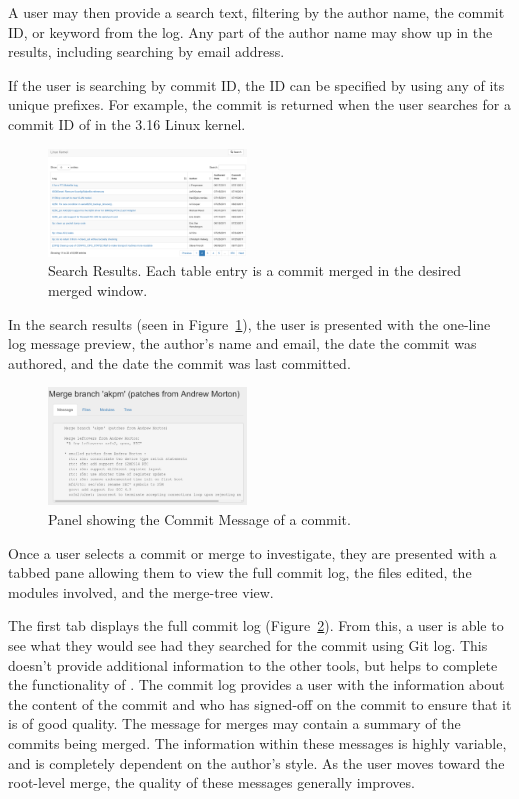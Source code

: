 A user may then provide a search text, filtering by the author name, the
commit ID, or keyword from the log. Any part of the author name may show
up in the results, including searching by email address.

If the user is searching by commit ID, the ID can be specified by using
any of its unique prefixes. For example, the commit
 is returned when the
user searches for a commit ID of  in the 3.16 Linux
kernel.

\begin{figure}
        \centering
        \includegraphics[width=0.47\textwidth]{figures/search_results_2.png}
        \caption{Search Results. Each table entry is a commit merged in the desired
                merged window.}
        \label{fig:results}
\end{figure}

In the search results (seen in Figure~\ref{fig:results}), the user is
presented with the one-line log message preview, the author's name and
email, the date the commit was authored, and the date the commit was
last committed.

\begin{figure}
        \centering
        \includegraphics[width=0.47\textwidth]{figures/log_view.png}
        \caption{Panel showing the Commit Message of a commit.}
        \label{fig:message}
\end{figure}

Once a user selects a commit or merge to investigate, they are presented
with a tabbed pane allowing them to view the full commit log, the files
edited, the modules involved, and the merge-tree view.

The first tab displays the full commit log (Figure~\ref{fig:message}).
From this, a user is able to see what they would see had they searched
for the commit using Git log. This doesn't provide additional
information to the other tools, but helps to complete the functionality
of \tool. The commit log provides a user with the information about the
content of the commit and who has signed-off on the commit to ensure
that it is of good quality. The message for merges may contain a summary
of the commits being merged.  The information within these messages is
highly variable, and is completely dependent on the author's style. As
the user moves toward the root-level merge, the quality of these
messages generally improves.

